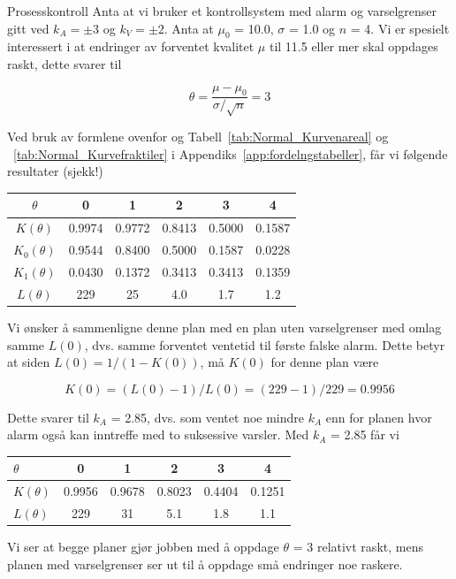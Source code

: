 \begin{eksempel}{Prosesskontroll}
Anta at vi bruker et kontrollsystem med alarm og varselgrenser gitt ved
$k_A = \pm 3$ og $k_V = \pm 2$.  Anta at ${\mu}_0$ = 10.0, 
$\sigma$ = 1.0 og $n$ = 4.  Vi er spesielt interessert i at endringer 
av forventet kvalitet $\mu$ til 11.5 eller mer skal oppdages raskt, dette
svarer til

\[  \theta =\frac{\mu - {\mu}_0}{\sigma /\sqrt{n}}=3 \]

\noindent Ved bruk av formlene ovenfor og Tabell~\ref{tab:Normal_Kurvenareal} og ~\ref{tab:Normal_Kurvefraktiler} i Appendiks~\ref{app:fordelngstabeller}, får vi 
følgende resultater (sjekk!)

\begin{center}
\begin{tabular}{|c|ccccc|} \hline
$\theta$       &      0     &     1     &     2     &     3     &   4 \\ \hline
$K(\theta)$    &   0.9974   &  0.9772   &  0.8413   &  0.5000   &  0.1587 \\
$K_0(\theta )$ &   0.9544   &  0.8400   &  0.5000   &  0.1587   &  0.0228 \\
$K_1(\theta )$ &   0.0430   &  0.1372   &  0.3413   &  0.3413   &  0.1359 \\
$L(\theta )$   &     229    &    25     &  4.0      &  1.7    &  1.2 \\ \hline
\end{tabular}
\end{center}

\noindent Vi ønsker å sammenligne denne plan med en plan uten varselgrenser
med omlag samme $L(0)$, dvs. samme forventet ventetid til første falske
alarm.  Dette betyr at siden $L(0) = 1/(1 - K(0))$, må $K(0)$ for
denne plan være

\[  K(0)=(L(0)-1)/L(0)=(229-1)/229=0.9956       \]

\noindent Dette svarer til $k_A$ = 2.85, dvs. som ventet noe mindre $k_A$ enn
for planen hvor alarm også kan inntreffe med to suksessive varsler.
Med $k_A$ = 2.85 får vi

\begin{center}
\begin{tabular}{|l|ccccc|} \hline
$\theta$     &     0     &     1     &     2     &     3     &     4 \\ \hline
$K(\theta )$ &  0.9956   &  0.9678   &  0.8023   &  0.4404   &  0.1251 \\
$L(\theta )$ &    229    &    31     &  5.1      &  1.8      &  1.1 \\ \hline
\end{tabular}
\end{center}
Vi ser at begge planer gjør jobben med å oppdage $\theta$ = 3
relativt raskt, mens planen med varselgrenser ser ut til å oppdage
små endringer noe raskere. \\
\end{eksempel}

